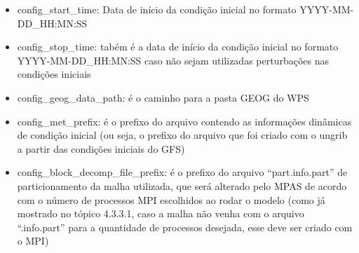 \documentclass[12pt,a4paper,oneside]{book}
\begin{document}
\begin{itemize}
\item
  config\_start\_time: Data de início da condição inicial no formato YYYY-MM-DD\_HH:MN:SS
\item
  config\_stop\_time: tabém é a data de início da condição inicial no formato YYYY-MM-DD\_HH:MN:SS caso não sejam utilizadas perturbações nas condições iniciais
\item
  config\_geog\_data\_path: é o caminho para a pasta GEOG do WPS
\item
  config\_met\_prefix: é o prefixo do arquivo contendo as informações dinâmicas de condição inicial (ou seja, o prefixo do arquivo que foi criado com o ungrib a partir das condições iniciais do GFS)
\item
  config\_block\_decomp\_file\_prefix: é o prefixo do arquivo ``part.info.part'' de particionamento da malha utilizada, que será alterado pelo MPAS de acordo com o número de processos MPI escolhidos ao rodar o modelo (como já mostrado no tópico 4.3.3.1, caso a malha não venha com o arquivo ``.info.part'' para a quantidade de processos desejada, esse deve ser criado com o MPI)
\end{itemize}
\end{document}
